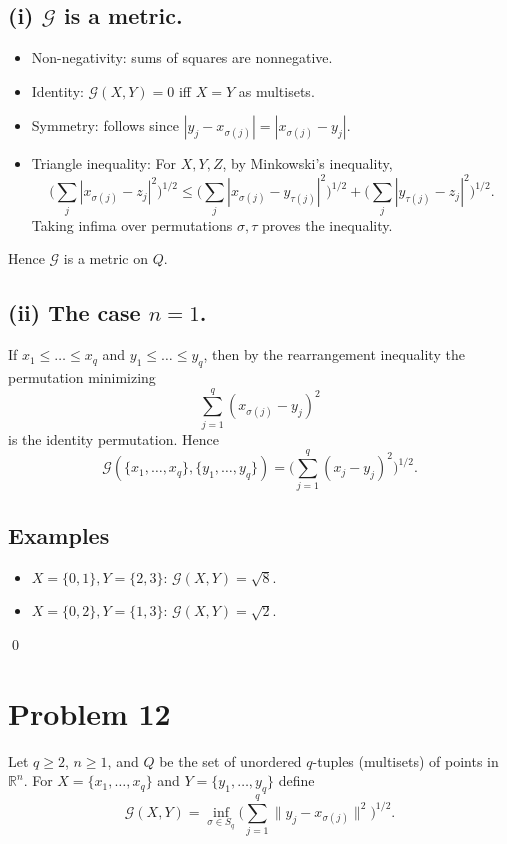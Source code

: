 \documentclass[11pt,a4paper]{article}
\theoremstyle{definition}
\theoremstyle{definition}
\theoremstyle{plain}
\theoremstyle{remark}
\begin{document}
\subsection*{(i) $\mathcal{G}$ is a metric.}
\begin{itemize}
	\item Non-negativity: sums of squares are nonnegative.
	\item Identity: $\mathcal{G}(X,Y)=0$ iff $X=Y$ as multisets.
	\item Symmetry: follows since $|y_j-x_{\sigma(j)}|=|x_{\sigma(j)}-y_j|$.
	\item Triangle inequality: For $X,Y,Z$, by Minkowski’s inequality,
	\[
	\Big(\sum_j |x_{\sigma(j)}-z_j|^2\Big)^{1/2}
	\leq \Big(\sum_j |x_{\sigma(j)}-y_{\tau(j)}|^2\Big)^{1/2} + \Big(\sum_j |y_{\tau(j)}-z_j|^2\Big)^{1/2}.
	\]
	Taking infima over permutations $\sigma,\tau$ proves the inequality.
\end{itemize}
Hence $\mathcal{G}$ is a metric on $Q$.

\subsection*{(ii) The case $n=1$.}
If $x_1\leq \dots \leq x_q$ and $y_1\leq \dots \leq y_q$, then by the rearrangement inequality the permutation minimizing
\[
\sum_{j=1}^q (x_{\sigma(j)}-y_j)^2
\]
is the identity permutation. Hence
\[
\mathcal{G}(\{x_1,\dots,x_q\}, \{y_1,\dots,y_q\})
= \Big(\sum_{j=1}^q (x_j-y_j)^2\Big)^{1/2}.
\]

\subsection*{Examples}
\begin{itemize}
	\item $X=\{0,1\}, Y=\{2,3\}$: $\mathcal{G}(X,Y)=\sqrt{8}$.
	\item $X=\{0,2\}, Y=\{1,3\}$: $\mathcal{G}(X,Y)=\sqrt{2}$.
\end{itemize}
\qed


\section*{Problem 12}
Let $q\ge 2$, $n\ge 1$, and $Q$ be the set of unordered $q$-tuples (multisets) of points in $\mathbb{R}^n$.
For $X=\{x_1,\dots,x_q\}$ and $Y=\{y_1,\dots,y_q\}$ define
\[
\mathcal{G}(X,Y)=\inf_{\sigma\in S_q}
\Big(\sum_{j=1}^q \|y_j-x_{\sigma(j)}\|^2\Big)^{1/2}.
\]
\end{document}
